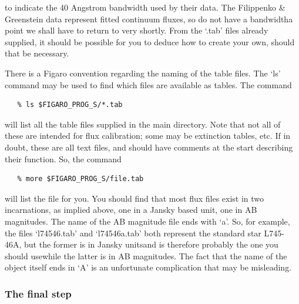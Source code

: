    to indicate the 40 Angstrom bandwidth used by their data.  The
   Filippenko \& Greenstein data represent fitted continuum fluxes,
   so do not have a bandwidth\latorhtm{---}{-}a point we shall have to
   return to very
   shortly.  From the `.tab' files already supplied, it should be
   possible for you to deduce how to create your own, should that be
   necessary.

   There is a Figaro convention regarding the naming of the table files.
   The `ls' command may be used to find which files are available
   as tables.  The command

\begin{verbatim}
   % ls $FIGARO_PROG_S/*.tab
\end{verbatim}

   will list all the table files supplied in the main directory.  Note
   that not all of these are intended for flux calibration; some may be
   extinction tables, etc.  If in doubt, these are all text files, and
   should have comments at the start describing their function.  So, the
   command

\begin{verbatim}
   % more $FIGARO_PROG_S/file.tab
\end{verbatim}

   will list the file for you.  You should find that most flux files
   exist in two incarnations, as implied above, one in a Jansky based
   unit, one in AB magnitudes.  The name of the AB magnitude file ends
   with `a'.  So, for example, the files `l74546.tab' and `l74546a.tab'
   both represent the standard star L745-46A, but the former is in
   Jansky units\latorhtm{---}{-}and is therefore probably the one you
   should use\latorhtm{---}{-}while the latter is in AB magnitudes.
   The fact that the name of the
   object itself ends in `A' is an unfortunate complication that may be
   misleading.


\subsubsection{\label{techno5final}The final step}

